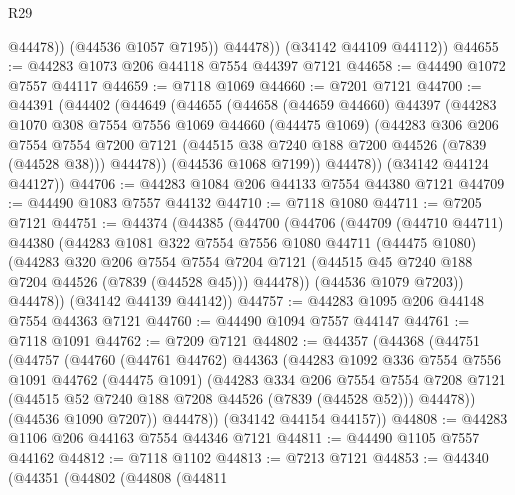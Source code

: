 \begin{lexlean}{R29}
\begin{coremodule}
                @44478))
            (@44536 @1057 @7195))
          @44478))
      (@34142 @44109 @44112))
@44655 := @44283 @1073 @206 @44118 @7554 @44397 @7121
@44658 := @44490 @1072 @7557 @44117
@44659 := @7118 @1069
@44660 := @7201 @7121
@44700 := @44391
    (@44402
      (@44649
        (@44655
          (@44658
            (@44659 @44660)
            @44397
            (@44283
              @1070
              @308
              @7554
              @7556
              @1069
              @44660
              (@44475 @1069)
              (@44283
                @306
                @206
                @7554
                @7554
                @7200
                @7121
                (@44515 @38 @7240 @188 @7200 @44526 (@7839 (@44528 @38)))
                @44478))
            (@44536 @1068 @7199))
          @44478))
      (@34142 @44124 @44127))
@44706 := @44283 @1084 @206 @44133 @7554 @44380 @7121
@44709 := @44490 @1083 @7557 @44132
@44710 := @7118 @1080
@44711 := @7205 @7121
@44751 := @44374
    (@44385
      (@44700
        (@44706
          (@44709
            (@44710 @44711)
            @44380
            (@44283
              @1081
              @322
              @7554
              @7556
              @1080
              @44711
              (@44475 @1080)
              (@44283
                @320
                @206
                @7554
                @7554
                @7204
                @7121
                (@44515 @45 @7240 @188 @7204 @44526 (@7839 (@44528 @45)))
                @44478))
            (@44536 @1079 @7203))
          @44478))
      (@34142 @44139 @44142))
@44757 := @44283 @1095 @206 @44148 @7554 @44363 @7121
@44760 := @44490 @1094 @7557 @44147
@44761 := @7118 @1091
@44762 := @7209 @7121
@44802 := @44357
    (@44368
      (@44751
        (@44757
          (@44760
            (@44761 @44762)
            @44363
            (@44283
              @1092
              @336
              @7554
              @7556
              @1091
              @44762
              (@44475 @1091)
              (@44283
                @334
                @206
                @7554
                @7554
                @7208
                @7121
                (@44515 @52 @7240 @188 @7208 @44526 (@7839 (@44528 @52)))
                @44478))
            (@44536 @1090 @7207))
          @44478))
      (@34142 @44154 @44157))
@44808 := @44283 @1106 @206 @44163 @7554 @44346 @7121
@44811 := @44490 @1105 @7557 @44162
@44812 := @7118 @1102
@44813 := @7213 @7121
@44853 := @44340
    (@44351
      (@44802
        (@44808
          (@44811

\end{coremodule}
\end{lexlean}

